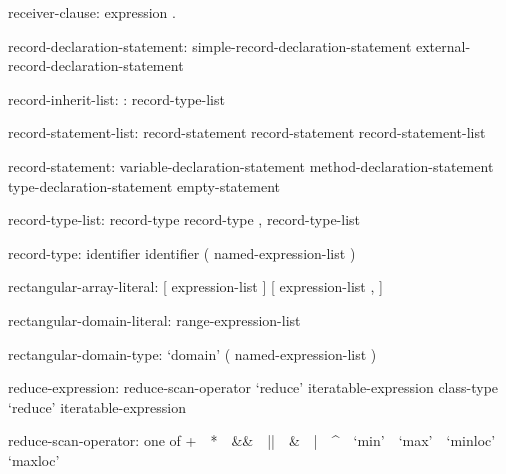 \begin{syntax}
receiver-clause:
  expression .
\end{syntax}

\begin{syntax}
record-declaration-statement:
  simple-record-declaration-statement
  external-record-declaration-statement
\end{syntax}

\begin{syntax}
record-inherit-list:
  : record-type-list
\end{syntax}

\begin{syntax}
record-statement-list:
  record-statement
  record-statement record-statement-list
\end{syntax}

\begin{syntax}
record-statement:
  variable-declaration-statement
  method-declaration-statement
  type-declaration-statement
  empty-statement
\end{syntax}

\begin{syntax}
record-type-list:
  record-type
  record-type , record-type-list
\end{syntax}

\begin{syntax}
record-type:
  identifier
  identifier ( named-expression-list )
\end{syntax}

\begin{syntax}
rectangular-array-literal:
  [ expression-list ]
  [ expression-list , ]
\end{syntax}

\begin{syntax}
rectangular-domain-literal:
  { range-expression-list }
\end{syntax}

\begin{syntax}
rectangular-domain-type:
  `domain' ( named-expression-list )
\end{syntax}

\begin{syntax}
reduce-expression:
  reduce-scan-operator `reduce' iteratable-expression
  class-type `reduce' iteratable-expression
\end{syntax}

\begin{syntax}
reduce-scan-operator: one of
  + $ $ $ $ * $ $ $ $ && $ $ $ $ || $ $ $ $ & $ $ $ $ | $ $ $ $ ^ $ $ $ $ `min' $ $ $ $ `max' $ $ $ $ `minloc' $ $ $ $ `maxloc'
\end{syntax}

